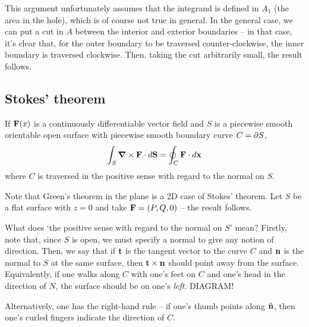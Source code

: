 \documentclass{../template/note}
\begin{document}
    \begin{remark*}
        This argument unfortunately assumes that the integrand is defined in \(A_1\) (the area in the hole), which is of course not true in general. In the general case, we can put a cut in \(A\) between the interior and exterior boundaries -- in that case, it's clear that, for the outer boundary to be traversed counter-clockwise, the inner boundary is traversed clockwise. Then, taking the cut arbitrarily small, the result follows.
    \end{remark*}
    
    \subsection{Stokes' theorem}

    \begin{theorem}
        If \(\V F(x)\) is a continuously differentiable vector field and \(S\) is a piecewise smooth orientable open surface with piecewise smooth boundary curve \(C = \partial S\),
        \begin{align*}
            \int_S \curl \V F \cdot d\V S = \oint_C \V F \cdot d\V x
        \end{align*}
        where \(C\) is traversed in the positive sense with regard to the normal on \(S\).  
    \end{theorem}
    
    \begin{remark*}
        Note that Green's theorem in the plane is a 2D case of Stokes' theorem. Let \(S\) be a flat surface with \(z=0\) and take \(\V F = (P, Q, 0)\) -- the result follows.
    \end{remark*}
    
    What does `the positive sense with regard to the normal on \(S\)' mean? Firstly, note that, since \(S\) is open, we must specify a normal to give any notion of direction. Then, we say that if \(\V t\) is the tangent vector to the curve \(C\) and \(\V n\) is the normal to \(S\) at the same surface, then \(\V t \times \V n\) should point away from the surface. Equivalently, if one walks along \(C\) with one's feet on \(C\) and one's head in the direction of \(N\), the surface should be on one's \emph{left}. DIAGRAM!

    Alternatively, one has the right-hand rule -- if one's thumb points along \(\hvec n\), then one's curled fingers indicate the direction of \(C\). 
\end{document}
